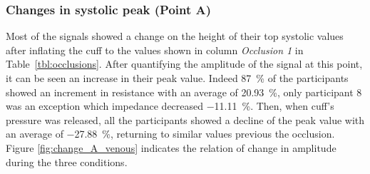 \subsubsection{Changes in systolic peak (Point A)}
\label{section results 3.1.1}
Most of the signals showed a change on the height of their top systolic values after inflating the cuff to the values shown in column \textit{Occlusion 1} in Table~\ref{tbl:occlusions}. After quantifying the amplitude of the signal at this point, it can be seen an increase in their peak value. Indeed \SI{87}{\percent} of the participants showed an increment in resistance with an average of \SI{20.93}{\percent}, only participant 8 was an exception which impedance decreased \SI{-11.11}{\percent}. Then, when cuff's pressure was released, all the participants showed a decline of the peak value with an average of \SI{-27.88}{\percent}, returning to similar values previous the occlusion. Figure \ref{fig:change_A_venous} indicates the relation of change in amplitude during the three conditions. 

